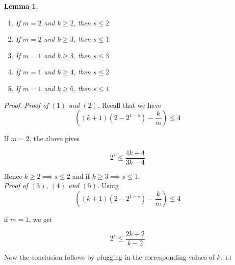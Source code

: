 \documentclass[12pt,twoside,]{amsart}
\theoremstyle{plain}
\newtheorem{lemma}[theorem]{Lemma}
\theoremstyle{definition}
\begin{document}
\begin{lemma}\label{m atmost 2}
    \begin{enumerate}
        \item If $m = 2$ and $k \geq 2$, then $s \leq 2$
        \item If $m = 2$ and $k \geq 3$, then $s \leq 1$
        \item If $m = 1$ and $k \geq 3$, then $s \leq 3$
        \item If $m = 1$ and $k \geq 4$, then $s \leq 2$
        \item If $m = 1$ and $k \geq 6$, then $s \leq 1$
    \end{enumerate}
\end{lemma}

\begin{proof}
\noindent\textit{Proof of $(1)$ and $(2)$.} Recall that we have 
\begin{equation*}
\left( (k+1)(2 -2^{1-s})- \frac{k}{m}\right) \leq 4
\end{equation*}

If $m = 2$, the above gives

\begin{equation*}
    2^s \leq \displaystyle\frac{4k+4}{3k-4}
\end{equation*}

Hence $k \geq 2 \implies s \leq 2$ and if $k \geq 3 \implies s \leq 1$. \\

\noindent\textit{Proof of $(3)$, $(4)$ and $(5)$.} 
Using 
\begin{equation*}
\left( (k+1)(2 -2^{1-s})- \frac{k}{m}\right) \leq 4
\end{equation*}

if $m = 1$, we get

\begin{equation*}
    2^s \leq \displaystyle\frac{2k+2}{k-2}
\end{equation*}

Now the conclusion follows by plugging in the corresponding values of $k$.
    
\end{proof}
\end{document}
